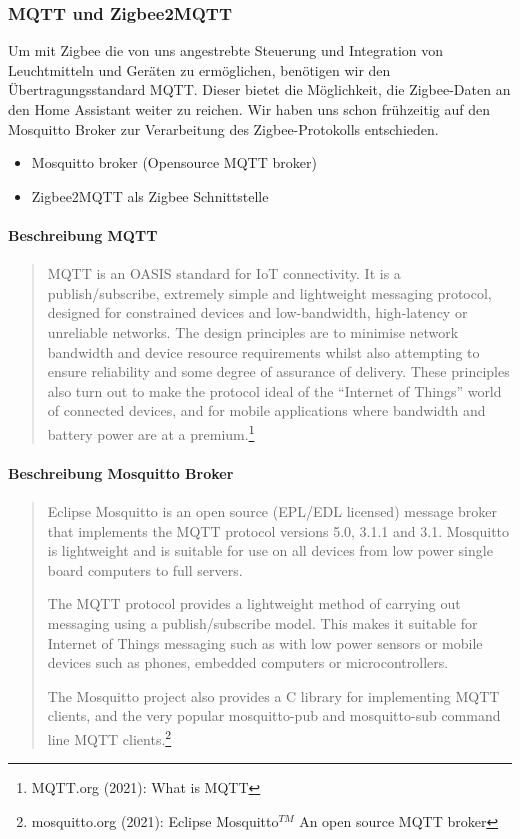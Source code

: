 \subsubsection{MQTT und Zigbee2MQTT}\label{hwg_software_mqtt_zibee2mqtt}
Um mit Zigbee die von uns angestrebte Steuerung und Integration von Leuchtmitteln und Geräten zu ermöglichen, benötigen wir den Übertragungsstandard MQTT. Dieser bietet die Möglichkeit, die Zigbee-Daten an den Home Assistant weiter zu reichen.
Wir haben uns schon frühzeitig auf den Mosquitto Broker zur Verarbeitung des Zigbee-Protokolls entschieden.
\begin{itemize}
    \item Mosquitto broker (Opensource MQTT broker)
    \item Zigbee2MQTT als Zigbee Schnittstelle
\end{itemize}
\noindent \paragraph{Beschreibung MQTT}
\begin{quote}
    \color{quotetext}
    MQTT is an OASIS standard for IoT connectivity. It is a publish/subscribe, extremely simple and lightweight messaging protocol, designed for constrained devices and low-bandwidth, high-latency or unreliable networks. The design principles are to minimise network bandwidth and device resource requirements whilst also attempting to ensure reliability and some degree of assurance of delivery. These principles also turn out to make the protocol ideal of the “Internet of Things” world of connected devices, and for mobile applications where bandwidth and battery power are at a premium.\footnote{MQTT.org (2021): What is MQTT}
\end{quote}
\noindent \paragraph{Beschreibung Mosquitto Broker}
\begin{quote}
    \color{quotetext}
 	    Eclipse Mosquitto is an open source (EPL/EDL licensed) message broker that implements the MQTT protocol versions 5.0, 3.1.1 and 3.1. Mosquitto is lightweight and is suitable for use on all devices from low power single board computers to full servers.

        The MQTT protocol provides a lightweight method of carrying out messaging using a publish/subscribe model. This makes it suitable for Internet of Things messaging such as with low power sensors or mobile devices such as phones, embedded computers or microcontrollers.

        The Mosquitto project also provides a C library for implementing MQTT clients, and the very popular mosquitto-pub and mosquitto-sub command line MQTT clients.\footnote{mosquitto.org (2021): Eclipse Mosquitto$^{TM}$ An open source MQTT broker}
\end{quote}
